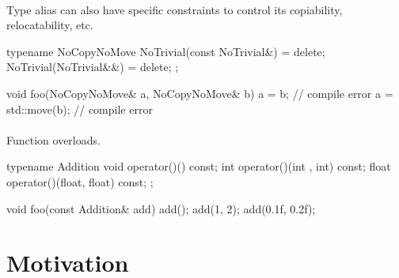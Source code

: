 \documentclass{article}
\begin{document}
\paragraph{}
Type alias can also have specific constraints to control its copiability, relocatability, etc.
\begin{codeblock}
typename NoCopyNoMove {
  NoTrivial(const NoTrivial&) = delete;
  NoTrivial(NoTrivial&&) = delete;
};

void foo(NoCopyNoMove& a, NoCopyNoMove& b) {
  a = b; // compile error
  a = std::move(b); // compile error
}
\end{codeblock}

\paragraph{}
Function overloads.

\begin{codeblock}
typename Addition {
  void operator()() const;
  int operator()(int , int) const;
  float operator()(float, float) const;
};

void foo(const Addition& add) {
  add();
  add(1, 2);
  add(0.1f, 0.2f);
}
\end{codeblock}

\section{Motivation}
\end{document}
